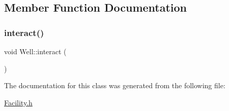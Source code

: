 \subsection{Member Function Documentation}
\mbox{\label{classWell_a0b05bce6404fb86371f31ae7734ca01c}} 
\subsubsection{\texorpdfstring{interact()}{interact()}}
{\footnotesize\ttfamily void Well\+::interact (\begin{DoxyParamCaption}{ }\end{DoxyParamCaption})}



The documentation for this class was generated from the following file\+:\begin{DoxyCompactItemize}
\item 
\mbox{\hyperlink{Facility_8h}{Facility.\+h}}\end{DoxyCompactItemize}
